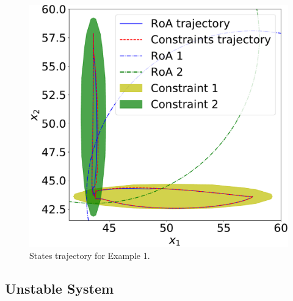 \begin{figure}[ht!]
  \centering
  \captionsetup{justification=centering}
  \includegraphics[width=0.9\linewidth]{imgs/tanks-states}
  \caption{States trajectory for Example 1.}%
  \label{fig:states}
\end{figure}

\FloatBarrier

\subsection{Unstable System}%
\label{subsec:unstable-system}

